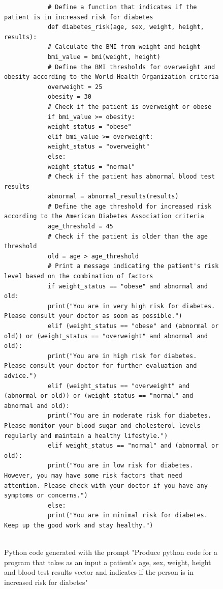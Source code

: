 \begin{figure}
\begin{tcolorbox}[raster multicolumn=1, enhanced, attach boxed title to top center={yshift=-3mm}, title=text-alpha-002-latest]
\begin{verbatim}
			# Define a function that indicates if the patient is in increased risk for diabetes
			def diabetes_risk(age, sex, weight, height, results):
			# Calculate the BMI from weight and height
			bmi_value = bmi(weight, height)
			# Define the BMI thresholds for overweight and obesity according to the World Health Organization criteria
			overweight = 25
			obesity = 30
			# Check if the patient is overweight or obese
			if bmi_value >= obesity:
			weight_status = "obese"
			elif bmi_value >= overweight:
			weight_status = "overweight"
			else:
			weight_status = "normal"
			# Check if the patient has abnormal blood test results
			abnormal = abnormal_results(results)
			# Define the age threshold for increased risk according to the American Diabetes Association criteria
			age_threshold = 45
			# Check if the patient is older than the age threshold
			old = age > age_threshold
			# Print a message indicating the patient's risk level based on the combination of factors
			if weight_status == "obese" and abnormal and old:
			print("You are in very high risk for diabetes. Please consult your doctor as soon as possible.")
			elif (weight_status == "obese" and (abnormal or old)) or (weight_status == "overweight" and abnormal and old):
			print("You are in high risk for diabetes. Please consult your doctor for further evaluation and advice.")
			elif (weight_status == "overweight" and (abnormal or old)) or (weight_status == "normal" and abnormal and old):
			print("You are in moderate risk for diabetes. Please monitor your blood sugar and cholesterol levels regularly and maintain a healthy lifestyle.")
			elif weight_status == "normal" and (abnormal or old):
			print("You are in low risk for diabetes. However, you may have some risk factors that need attention. Please check with your doctor if you have any symptoms or concerns.")
			else:
			print("You are in minimal risk for diabetes. Keep up the good work and stay healthy.")		
			
		\end{verbatim}
	\end{tcolorbox}		
	\fi
	\caption{Python code generated with the prompt "Produce python code for a program that takes as an input a patient's age, sex, weight, height and blood test results vector and indicates if the person is in increased risk for diabetes"}
	\label{fig:medprog}
\end{figure}




